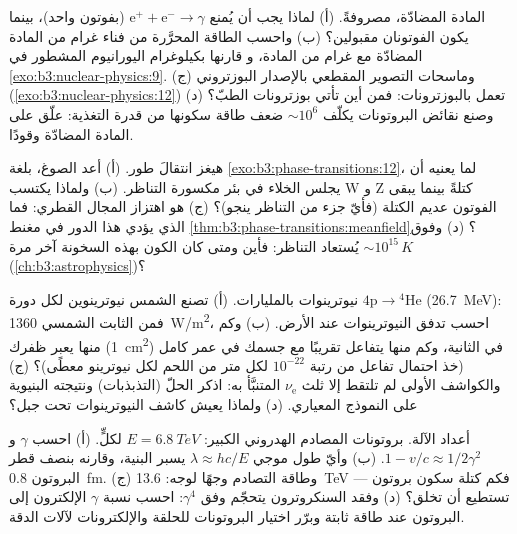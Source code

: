 \begin{exercise}[$\star\star$]\label{exo:b3:particle-physics:8}
المادة المضادّة، مصروفةً. (أ) لماذا يجب أن يُمنع
$\text{e}^+ + \text{e}^- \to \gamma$ (بفوتون واحد)،
بينما يكون الفوتونان مقبولين؟ (ب) واحسب الطاقة المحرَّرة من
فناء غرام من المادة المضادّة مع غرام من المادة، و
قارنها بكيلوغرام اليورانيوم المشطور في
\cref{exo:b3:nuclear-physics:9}. (ج) وماسحات التصوير المقطعي بالإصدار البوزتروني
(\cref{exo:b3:nuclear-physics:12}) تعمل بالبوزترونات: فمن أين تأتي
بوزترونات الطبّ؟ (د) وصنع نقائض البروتونات يكلّف
$\sim10^{6}$ ضعف طاقة سكونها من قدرة التغذية: علّق
على المادة المضادّة وقودًا.
\end{exercise}

\begin{exercise}[$\star\star\star$]\label{exo:b3:particle-physics:9}
هيغز انتقالَ طور. (أ) أعد الصوغ، بلغة
\cref{exo:b3:phase-transitions:12}، لما يعنيه أن يجلس
الخلاء في بئر مكسورة التناظر. (ب) ولماذا يكتسب W و Z
كتلةً بينما يبقى الفوتون عديم الكتلة (فأيّ جزء من
التناظر ينجو)؟ (ج)  هو اهتزاز المجال القطري:
فما الذي يؤدي هذا الدور في مغنط
\cref{thm:b3:phase-transitions:meanfield}؟ (د) وفوق
$\sim10^{15}\,\unit{K}$ يُستعاد التناظر: فأين ومتى
كان الكون بهذه السخونة آخر مرة (\cref{ch:b3:astrophysics})؟
\end{exercise}

\begin{exercise}[$\star\star\star$]\label{exo:b3:particle-physics:10}
نيوترينوات بالمليارات. (أ) تصنع الشمس نيوترينوين لكل
دورة $4\text{p} \to {}^4\text{He}$ (\qty{26.7}{MeV}): فمن
الثابت الشمسي \qty{1360}{W/m^2}، احسب تدفق النيوترينوات عند
الأرض. (ب) وكم منها يعبر ظفرك
(\qty{1}{cm^2}) في الثانية، وكم منها يتفاعل تقريبًا
مع جسمك في عمر كامل (خذ احتمال تفاعل
من رتبة $10^{-22}$ لكل متر من اللحم لكل نيوترينو
معطًى)؟ (ج) والكواشف
الأولى لم تلتقط إلا ثلث $\nu_{\text{e}}$
المتنبَّأ به: اذكر الحلّ (التذبذبات) ونتيجته
البنيوية على النموذج المعياري. (د) ولماذا يعيش كاشف
النيوترينوات تحت جبل؟
\end{exercise}

\begin{exercise}[$\star\star\star$]\label{exo:b3:particle-physics:11}
أعداد الآلة. بروتونات المصادم الهدروني الكبير: $E = \qty{6.8}{TeV}$ لكلٍّ. (أ)
احسب $\gamma$ و $1 - v/c \approx 1/2\gamma^2$. (ب) وأيّ
طول موجي $\lambda \approx hc/E$ يسبر البنية، وقارنه
بنصف قطر البروتون \qty{0.8}{fm}. (ج) وطاقة التصادم وجهًا لوجه:
\qty{13.6}{TeV} --- فكم كتلة سكون بروتون تستطيع
أن تخلق؟ (د) وفقد السنكروترون يتحجّم وفق $\gamma^4$:
احسب نسبة $\gamma$ الإلكترون إلى البروتون عند طاقة ثابتة
وبرّر اختيار البروتونات للحلقة والإلكترونات لآلات الدقة.
\end{exercise}

